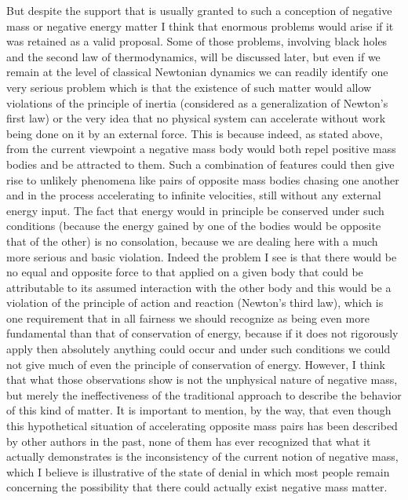 \documentclass[notitlepage,12pt]{report}
\begin{document}
But despite the support that is usually granted to such a conception of negative mass or negative energy matter I think that enormous problems would arise if it was retained as a valid proposal. Some of those problems, involving black holes and the second law of thermodynamics, will be discussed later, but even if we remain at the level of classical Newtonian dynamics we can readily identify one very serious problem which is that the existence of such matter would allow violations of the principle of inertia (considered as a generalization of Newton's first law) or the very idea that no physical system can accelerate without work being done on it by an external force. This is because indeed, as stated above, from the current viewpoint a negative mass body would both repel positive mass bodies and be attracted to them. Such a combination of features could then give rise to unlikely phenomena like pairs of opposite mass bodies chasing one another and in the process accelerating to infinite velocities, still without any external energy input. The fact that energy would in principle be conserved under such conditions (because the energy gained by one of the bodies would be opposite that of the other) is no consolation, because we are dealing here with a much more serious and basic violation. Indeed the problem I see is that there would be no equal and opposite force to that applied on a given body that could be attributable to its assumed interaction with the other body and this would be a violation of the principle of action and reaction (Newton's third law), which is one requirement that in all fairness we should recognize as being even more fundamental than that of conservation of energy, because if it does not rigorously apply then absolutely anything could occur and under such conditions we could not give much of even the principle of conservation of energy. However, I think that what those observations show is not the unphysical nature of negative mass, but merely the ineffectiveness of the traditional approach to describe the behavior of this kind of matter. It is important to mention, by the way, that even though this hypothetical situation of accelerating opposite mass pairs has been described by other authors in the past, none of them has ever recognized that what it actually demonstrates is the inconsistency of the current notion of negative mass, which I believe is illustrative of the state of denial in which most people remain concerning the possibility that there could actually exist negative mass matter.
\end{document}
